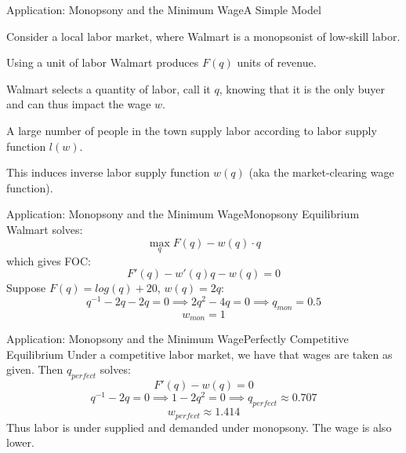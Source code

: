 \documentclass[aspectratio=169]{beamer}
\newenvironment{wideitemize}{\itemize\addtolength{\itemsep}{10pt}}{\enditemize}
\begin{document}
\begin{frame}{Application: Monopsony and the Minimum Wage}{A Simple Model}
\begin{wideitemize}
        \item Consider a local labor market, where Walmart is a monopsonist of low-skill labor.
        \item Using a unit of labor Walmart produces $F(q)$ units of revenue.
        \item Walmart selects a quantity of labor, call it $q$, knowing that it is the only buyer and can thus impact the wage $w$.
        \item A large number of people in the town supply labor according to labor supply function $l(w)$.
        \item This induces inverse labor supply function $w(q)$ (aka the market-clearing wage function).
\end{wideitemize}
\end{frame}


\begin{frame}{Application: Monopsony and the Minimum Wage}{Monopsony Equilibrium}
 Walmart solves:
        \[\max_q F(q) - w(q)\cdot q \]
which gives FOC:
\[F'(q)-w'(q)q-w(q)=0\]
Suppose $F(q)=log(q)+20$, $w(q)=2q$:
\[q^{-1} - 2q-2q=0 \implies 2q^2-4q=0 \implies q_{mon} =0.5\]
\[w_{mon} =1 \]
\end{frame}


\begin{frame}{Application: Monopsony and the Minimum Wage}{Perfectly Competitive Equilibrium}
Under a competitive labor market, we have that wages are taken as given. Then $q_{perfect}$ solves:
\[F'(q)-w(q)=0\]
\[q^{-1} - 2q=0 \implies 1-2q^2=0 \implies q_{perfect} \approx 0.707  \]
\[w_{perfect} \approx 1.414 \]
Thus labor is under supplied and demanded under monopsony. The wage is also lower.
 \end{frame}
 
\end{document}
